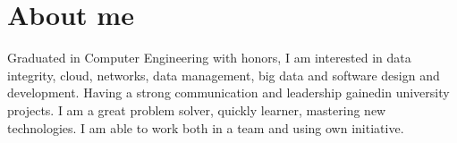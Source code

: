 \documentclass[letterpaper]{twentysecondcv}
\begin{document}
\aboutme{}






\makeprofile %


\section{About me}

Graduated in Computer Engineering with honors, I am interested in data integrity, cloud, networks, data management, big data and software design and development. Having a strong communication and leadership gainedin university projects. I am a great problem solver, quickly learner, mastering new technologies. I am able to work both in a team and using own initiative.
\vspace{6pt}
\end{document}
